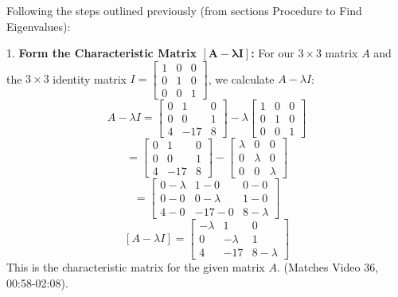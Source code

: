 \documentclass{article}
\begin{document}
Following the steps outlined previously (from sections Procedure to Find Eigenvalues):

1.  \textbf{Form the Characteristic Matrix $\mathbf{[A - \lambda I]}$:}
    For our $3 \times 3$ matrix $A$ and the $3 \times 3$ identity matrix $I=\begin{bmatrix} 1 & 0 & 0 \\ 0 & 1 & 0 \\ 0 & 0 & 1 \end{bmatrix}$, we calculate $A - \lambda I$:
    \[ A - \lambda I = \begin{bmatrix} 0 & 1 & 0 \\ 0 & 0 & 1 \\ 4 & -17 & 8 \end{bmatrix} - \lambda \begin{bmatrix} 1 & 0 & 0 \\ 0 & 1 & 0 \\ 0 & 0 & 1 \end{bmatrix} \]
    \[ = \begin{bmatrix} 0 & 1 & 0 \\ 0 & 0 & 1 \\ 4 & -17 & 8 \end{bmatrix} - \begin{bmatrix} \lambda & 0 & 0 \\ 0 & \lambda & 0 \\ 0 & 0 & \lambda \end{bmatrix} \]
    \[ = \begin{bmatrix} 0 - \lambda & 1 - 0 & 0 - 0 \\ 0 - 0 & 0 - \lambda & 1 - 0 \\ 4 - 0 & -17 - 0 & 8 - \lambda \end{bmatrix} \]
    \[ [A - \lambda I] = \begin{bmatrix} -\lambda & 1 & 0 \\ 0 & -\lambda & 1 \\ 4 & -17 & 8 - \lambda \end{bmatrix} \]
    This is the characteristic matrix for the given matrix $A$. (Matches Video 36, 00:58-02:08).
\end{document}
